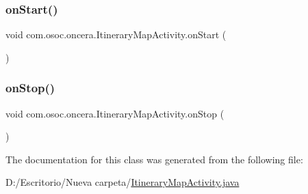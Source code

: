 \mbox{\label{classcom_1_1osoc_1_1oncera_1_1_itinerary_map_activity_a1e3e638d36340b03019db8e8f66e1fcf}} 
\subsubsection{\texorpdfstring{onStart()}{onStart()}}
{\footnotesize\ttfamily void com.\+osoc.\+oncera.\+Itinerary\+Map\+Activity.\+on\+Start (\begin{DoxyParamCaption}{ }\end{DoxyParamCaption})}

\mbox{\label{classcom_1_1osoc_1_1oncera_1_1_itinerary_map_activity_afe7755630a6458cf950614f854fa50f9}} 
\subsubsection{\texorpdfstring{onStop()}{onStop()}}
{\footnotesize\ttfamily void com.\+osoc.\+oncera.\+Itinerary\+Map\+Activity.\+on\+Stop (\begin{DoxyParamCaption}{ }\end{DoxyParamCaption})}



The documentation for this class was generated from the following file\+:\begin{DoxyCompactItemize}
\item 
D\+:/\+Escritorio/\+Nueva carpeta/\mbox{\hyperlink{_itinerary_map_activity_8java}{Itinerary\+Map\+Activity.\+java}}\end{DoxyCompactItemize}
